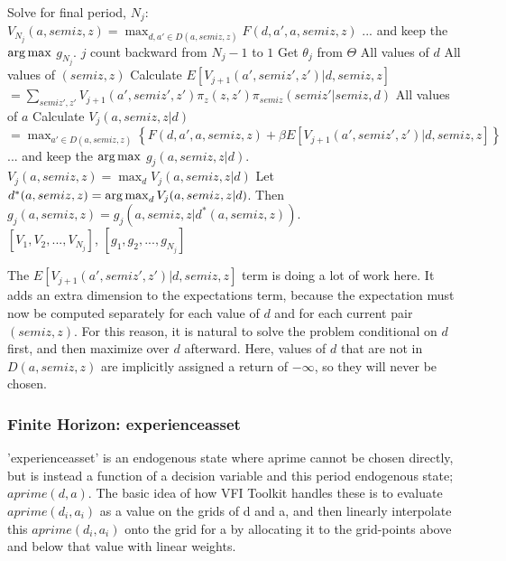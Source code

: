 \begin{algorithmic}
 \State Solve for final period, $N_j$: $V_{N_j}(a,semiz,z)=\max_{d,a' \in D(a,semiz,z)} F(d,a',a,semiz,z)$
 \State ... and keep the $\operatorname*{arg\,max}$ $g_{N_j}$.
 \For $j$ count backward from $N_j-1$ to $1$
   \State Get $\theta_j$ from $\Theta$
   \For All values of $d$
    \For All values of $(semiz,z)$
     \State Calculate $E[V_{j+1}(a',semiz',z')|d,semiz,z]$
     \Statex \hspace{\algorithmicindent} $=\sum_{semiz',z'} V_{j+1}(a',semiz',z') \pi_z(z,z') \pi_{semiz}(semiz'|semiz,d)$
     \For All values of $a$
      \State Calculate $V_j(a,semiz,z|d)$
      \Statex \hspace{\algorithmicindent} $=\max_{a' \in D(a,semiz,z)} \left\{ F(d,a',a,semiz,z)+\beta E[V_{j+1}(a',semiz',z')|d,semiz,z] \right\}$
      \State ... and keep the $\operatorname*{arg\,max}$ $g_j(a,semiz,z|d)$.
      \EndFor
     \EndFor
    \EndFor
    \State $V_j(a,semiz,z)=\max_{d} V_j(a,semiz,z|d)$
    \State Let $d^*(a,semiz,z)=\operatorname*{arg\,max}_d V_j(a,semiz,z|d)$.
    \State Then $g_j(a,semiz,z)=g_j(a,semiz,z|d^*(a,semiz,z))$.
  \EndFor
   \\ \Return $[V_1,V_2,...,V_{N_j}]$, $[g_1,g_2,...,g_{N_j}]$
\end{algorithmic}

The $E[V_{j+1}(a',semiz',z')|d,semiz,z]$ term is doing a lot of work here. It adds an extra dimension to the expectations term, because the expectation must now be computed separately for each value of $d$ and for each current pair $(semiz,z)$. For this reason, it is natural to solve the problem conditional on $d$ first, and then maximize over $d$ afterward. Here, values of $d$ that are not in $D(a,semiz,z)$ are implicitly assigned a return of $-\infty$, so they will never be chosen.


\subsubsection{Finite Horizon: experienceasset}
'experienceasset' is an endogenous state where aprime cannot be chosen directly, but is instead a function of a decision variable and this period endogenous state; $aprime(d,a)$. The basic idea of how VFI Toolkit handles these is to evaluate $aprime(d_i,a_i)$ as a value on the grids of d and a, and then linearly interpolate this $aprime(d_i,a_i)$ onto the grid for a by allocating it to the grid-points above and below that value with linear weights.

